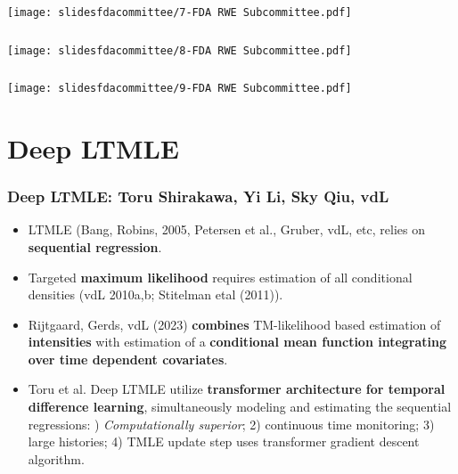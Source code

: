 \documentclass[t]{beamer}
\begin{document}
\begin{frame}
\frametitle{}
\vspace{20pt}
\begin{center}
\texttt{[image: slidesfdacommittee/7-FDA RWE Subcommittee.pdf]}
\end{center}
\vspace{35pt}
\end{frame}
\begin{frame}
\frametitle{}
\vspace{20pt}
\begin{center}
\texttt{[image: slidesfdacommittee/8-FDA RWE Subcommittee.pdf]}
\end{center}
\vspace{35pt}
\end{frame}

\begin{frame}
\frametitle{}
\vspace{20pt}
\begin{center}
\texttt{[image: slidesfdacommittee/9-FDA RWE Subcommittee.pdf]}
\end{center}
\vspace{35pt}
\end{frame}
\section{Deep LTMLE}


\begin{frame}\frametitle{Deep LTMLE: Toru Shirakawa, Yi Li, Sky Qiu, vdL}
\begin{itemize}
\item LTMLE (Bang, Robins, 2005, Petersen et al., Gruber, vdL, etc, relies on {\bf sequential regression}.
\item Targeted {\bf maximum likelihood} requires estimation of all conditional densities (vdL 2010a,b; Stitelman etal (2011)).
\item Rijtgaard, Gerds, vdL (2023) {\bf combines}  TM-likelihood based estimation of {\bf intensities}  with estimation of a {\bf conditional mean function integrating over time dependent covariates}.
\item Toru et al. Deep LTMLE utilize {\bf transformer architecture for temporal difference learning}, simultaneously modeling and estimating the sequential regressions: )  {\em Computationally superior}; 2) continuous time monitoring; 3)  large histories; 4)  TMLE update step uses transformer gradient descent algorithm. 
\end{itemize}
\end{frame} 
\end{document}
